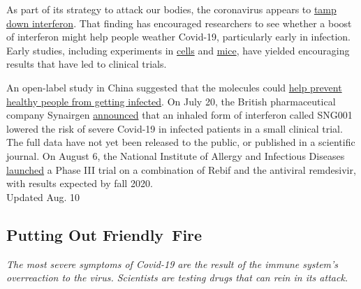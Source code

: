 As part of its strategy to attack our bodies, the coronavirus appears to
\href{https://www.nytimes3xbfgragh.onion/2020/08/04/health/coronavirus-immune-system.html}{tamp
down interferon}. That finding has encouraged researchers to see whether
a boost of interferon might help people weather Covid-19, particularly
early in infection. Early studies, including experiments in
\href{https://academic.oup.com/jid/article/doi/10.1093/infdis/jiaa350/5860074}{cells}
and \href{https://pubmed.ncbi.nlm.nih.gov/32511406/}{mice}, have yielded
encouraging results that have led to clinical trials.

An open-label study in China suggested that the molecules could
\href{https://www.medrxiv.org/content/10.1101/2020.04.11.20061473v2}{help
prevent healthy people from getting infected}. On July 20, the British
pharmaceutical company Synairgen
\href{https://www.nytimes3xbfgragh.onion/2020/07/20/world/covid-19-treatment-synairgen-interferon-beta.html}{announced}
that an inhaled form of interferon called SNG001 lowered the risk of
severe Covid-19 in infected patients in a small clinical trial. The full
data have not yet been released to the public, or published in a
scientific journal. On August 6, the National Institute of Allergy and
Infectious Diseases
\href{https://www.nih.gov/news-events/news-releases/nih-clinical-trial-testing-remdesivir-plus-interferon-beta-1a-covid-19-treatment-begins}{launched}
a Phase III trial on a combination of Rebif and the antiviral
remdesivir, with results expected by fall 2020.\\
Updated Aug. 10

\hypertarget{putting-out-friendly-fire}{%
\subsection{Putting Out Friendly~Fire}\label{putting-out-friendly-fire}}

\emph{The most severe symptoms of Covid-19 are the result of the immune
system's overreaction to the virus. Scientists are testing drugs that
can rein in its attack.}

